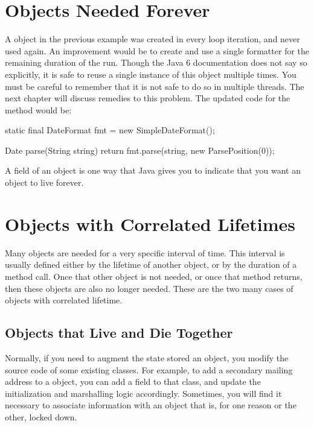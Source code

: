 



\section{Objects Needed Forever}
\label{forever-lifetime}

A  object in the previous example was created in every
loop iteration, and never used again. An improvement would be to create and
use a single formatter for the remaining duration of the run. Though the Java 6
documentation does not say so explicitly, it is safe to reuse a single instance
of this object multiple times. You must be careful to remember that it is
not safe to do so in multiple threads. The next chapter will discuss remedies
to this problem. The updated code for the  method would be:

\begin{shortlisting}
static final DateFormat fmt = new SimpleDateFormat();

Date parse(String string) {
	return fmt.parse(string, new ParsePosition(0));
}
\end{shortlisting} 

A  field of an object is one way that Java gives you to indicate
that you want an object to live forever.

\section{Objects with Correlated Lifetimes}

Many objects are needed for a very specific interval of time. This interval is
usually defined either by the lifetime of another object, or by the duration of
a method call. Once that other object is not needed, or once that method
returns, then these objects are also no longer needed. These are the two many
cases of objects with correlated lifetime.

\subsection{Objects that Live and Die Together}
\label{correlated-lifetime-1}

Normally, if you need to augment the state stored an object, you modify
the source code of some existing classes. For example, to add a secondary
mailing address to a  object, you can add a field to that class, and update the
initialization and marshalling logic accordingly. Sometimes, you will find it
necessary to associate information with an object that is, for one reason or the
other, locked down.

